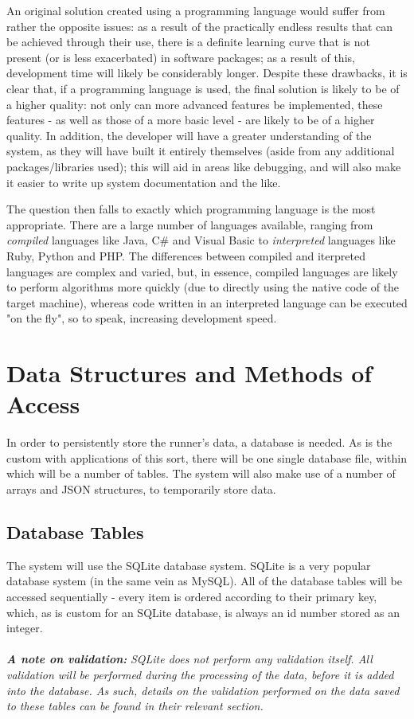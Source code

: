 \documentclass{article}[12pt,a4paper]
\begin{document}
An original solution created using a programming language would suffer from rather the opposite issues: as a result of the practically endless results that can be achieved through their use, there is a definite learning curve that is not present (or is less exacerbated) in software packages; as a result of this, development time will likely be considerably longer. Despite these drawbacks, it is clear that, if a programming language is used, the final solution is likely to be of a higher quality: not only can more advanced features be implemented, these features - as well as those of a more basic level - are likely to be of a higher quality.  In addition, the developer will have a greater understanding of the system, as they will have built it entirely themselves (aside from any additional packages/libraries used); this will aid in areas like debugging, and will also make it easier to write up system documentation and the like.

The question then falls to exactly which programming language is the most appropriate. There are a large number of languages available, ranging from \textit{compiled} languages like Java, C\# and Visual Basic to \textit{interpreted} languages like Ruby, Python and PHP. The differences between compiled and iterpreted languages are complex and varied, but, in essence, compiled languages are likely to perform algorithms more quickly (due to directly using the native code of the target machine), whereas code written in an interpreted language can be executed "on the fly", so to speak, increasing development speed. 

\section{Data Structures and Methods of Access}
In order to persistently store the runner's data, a database is needed. As is the custom with applications of this sort, there will be one single database file, within which will be a number of tables. The system will also make use of a number of arrays and JSON structures, to temporarily store data.

\subsection{Database Tables}
The system will use the SQLite database system. SQLite is a very popular database system (in the same vein as MySQL). All of the database tables will be accessed sequentially - every item is ordered according to their primary key, which, as is custom for an SQLite database, is always an id number stored as an integer.
\\\\\textbf{\textit{A note on validation: }}\textit{SQLite does not perform any validation itself. All validation will be performed during the processing of the data, before it is added into the database. As such, details on the validation performed on the data saved to these tables can be found in their relevant section.}
\end{document}
